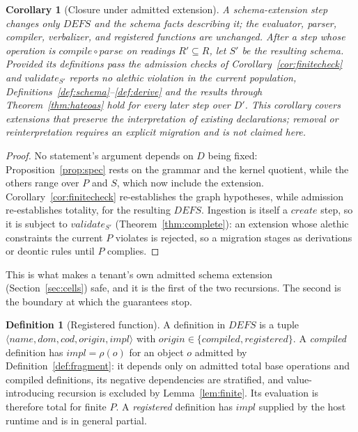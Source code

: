 \documentclass[10pt,twocolumn]{article}
\theoremstyle{plain}
\newtheorem{corollary}{Corollary}
\theoremstyle{definition}
\newtheorem{definition}{Definition}
\begin{document}
\begin{corollary}[Closure under admitted extension]\label{cor:closure}
A schema-extension step changes only $\mathit{DEFS}$ and the schema facts describing it; the evaluator, parser, compiler, verbalizer, and registered functions are unchanged. After a step whose operation is $\mathit{compile}\circ\mathit{parse}$ on readings $R'\subseteq R$, let $S'$ be the resulting schema. Provided its definitions pass the admission checks of Corollary~\ref{cor:finitecheck} and $\mathit{validate}_{S'}$ reports no alethic violation in the current population, Definitions~\ref{def:schema}--\ref{def:derive} and the results through Theorem~\ref{thm:hateoas} hold for every later step over $D'$. This corollary covers extensions that preserve the interpretation of existing declarations; removal or reinterpretation requires an explicit migration and is not claimed here.
\end{corollary}
\begin{proof}
No statement's argument depends on $D$ being fixed: Proposition~\ref{prop:spec} rests on the grammar and the kernel quotient, while the others range over $P$ and $S$, which now include the extension. Corollary~\ref{cor:finitecheck} re-establishes the graph hypotheses, while admission re-establishes totality, for the resulting $\mathit{DEFS}$. Ingestion is itself a $\mathit{create}$ step, so it is subject to $\mathit{validate}_{S'}$ (Theorem~\ref{thm:complete}): an extension whose alethic constraints the current $P$ violates is rejected, so a migration stages as derivations or deontic rules until $P$ complies.
\end{proof}

\noindent This is what makes a tenant's own admitted schema extension (Section~\ref{sec:cells}) safe, and it is the first of the two recursions. The second is the boundary at which the guarantees stop.

\begin{definition}[Registered function]\label{def:reg}
A definition in $\mathit{DEFS}$ is a tuple $\langle\mathit{name},\mathit{dom},\mathit{cod},\mathit{origin},\mathit{impl}\rangle$ with $\mathit{origin}\in\{\mathit{compiled},\mathit{registered}\}$. A \emph{compiled} definition has $\mathit{impl}=\rho(o)$ for an object $o$ admitted by Definition~\ref{def:fragment}: it depends only on admitted total base operations and compiled definitions, its negative dependencies are stratified, and value-introducing recursion is excluded by Lemma~\ref{lem:finite}. Its evaluation is therefore total for finite $P$. A \emph{registered} definition has $\mathit{impl}$ supplied by the host runtime and is in general partial.
\end{definition}
\end{document}
